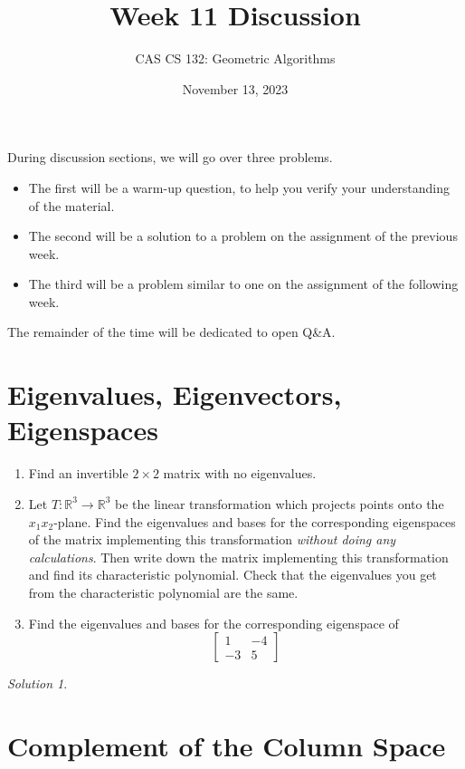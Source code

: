\documentclass{article}
\title{
  Week 11 Discussion
}
\author{CAS CS 132: Geometric Algorithms}
\date{November 13, 2023}
\theoremstyle{remark}
\newtheorem*{solution}{Solution}
\begin{document}
\maketitle

\noindent During discussion sections, we will go over three problems.
\begin{itemize}
\item The first will be a warm-up question, to help you verify your understanding of the material.
\item The second will be a solution to a problem on the assignment of the previous week.
\item The third will be a problem similar to one on the assignment of the following week.
\end{itemize}
The remainder of the time will be dedicated to open Q\&A.

\pagebreak
\section{Eigenvalues, Eigenvectors, Eigenspaces}

\begin{enumerate}
\item Find an invertible $2 \times 2$ matrix with no eigenvalues.
\item
  Let $T : \mathbb R^3 \to \mathbb R^3$ be the linear transformation which projects points onto the $x_1x_2$-plane.
  Find the eigenvalues and bases for the corresponding eigenspaces of the matrix implementing this transformation \textit{without doing any calculations}.
  Then write down the matrix implementing this transformation and find its characteristic polynomial.
  Check that the eigenvalues you get from the characteristic polynomial are the same.
\item
  Find the eigenvalues and bases for the corresponding eigenspace of
  \begin{displaymath}
    \begin{bmatrix}
      1 & -4 \\
      -3 & 5
    \end{bmatrix}
  \end{displaymath}

\end{enumerate}

\begin{solution}
\end{solution}

\pagebreak
\section{Complement of the Column Space}
\end{document}
